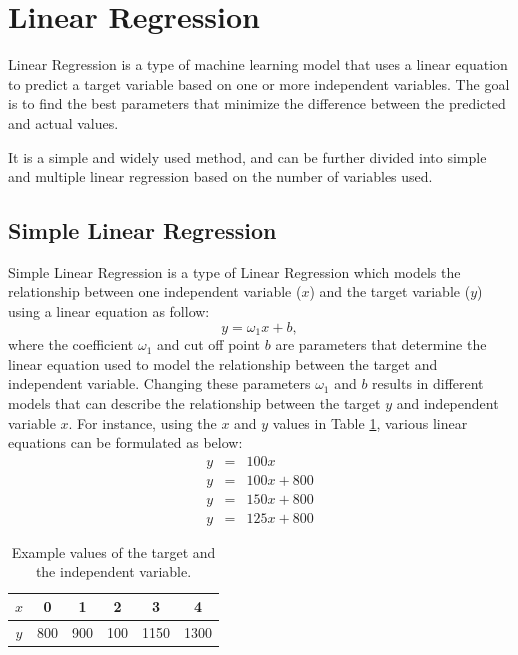 \newpage
\section{Linear Regression}

Linear Regression is a type of machine learning model that uses a linear equation to predict a target variable based on one or more independent variables. The goal is to find the best parameters that minimize the difference between the predicted and actual values.

It is a simple and widely used method, and can be further divided into simple and multiple linear regression based on the number of variables used.

\subsection{Simple Linear Regression}

Simple Linear Regression is a type of Linear Regression which models the relationship between one independent variable ($x$) and the target variable ($y$) using a linear equation as follow:
\begin{equation}\label{eq:lrmodel}
  y = \omega_1 x + b,
\end{equation} where the coefficient $\omega_1$ and cut off point $b$ are parameters that determine the linear equation used to model the relationship between the target and independent variable. Changing these parameters $\omega_1$ and $b$ results in different models that can describe the relationship between the target $y$ and independent variable $x$. For instance, using the $x$ and $y$ values in Table \ref{tb:lrmodel}, various linear equations can be formulated as below:
\begin{eqnarray}
  y &=& 100x \\
  y &=& 100x + 800 \\
  y &=& 150x + 800 \\
  y &=& 125x + 800
\end{eqnarray}

\begin{table}[!ht]
\centering
\begin{tabular}{|c|c|c|c|c|c| }
  \hline
  $x$ & 0 & 1 & 2 & 3 & 4  \\
  \hline
  $y$ & 800 & 900& 100 & 1150 & 1300\\
  \hline
\end{tabular}
\caption{Example values of the target and the independent variable.}\label{tb:lrmodel}
\end{table}

